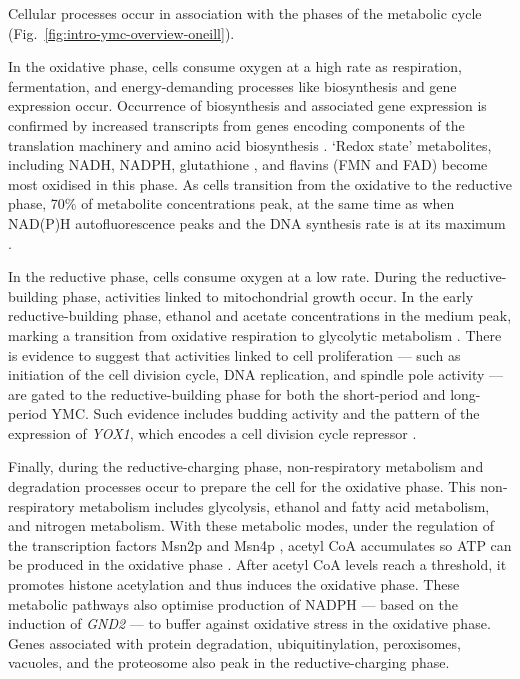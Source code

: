 Cellular processes occur in association with the phases of the metabolic cycle (Fig.\ \ref{fig:intro-ymc-overview-oneill}).

In the oxidative phase, cells consume oxygen at a high rate as respiration, fermentation, and
energy-demanding processes
like biosynthesis and gene expression occur.
Occurrence of biosynthesis and associated gene expression is confirmed by increased transcripts from genes encoding components of the translation machinery and amino acid biosynthesis \parencite{tuLogicYeastMetabolic2005}.
`Redox state' metabolites, including NADH, NADPH, glutathione \parencite{lloydUltradianMetronomeTimekeeper2005}, and flavins (FMN and FAD)
\parencite{murrayRedoxRegulationRespiring2011} become most oxidised in this phase.
As cells transition from the oxidative to the reductive phase, 70\% of metabolite concentrations peak, at the same time as when NAD(P)H autofluorescence peaks and the DNA synthesis rate is at its maximum \parencite{lloydTemporalArchitectureEukaryotic2006}.

In the reductive phase, cells consume oxygen at a low rate.
During the reductive-building phase, activities linked to mitochondrial growth occur.
In the early reductive-building phase, ethanol and acetate concentrations in the medium peak, marking a transition from oxidative respiration to glycolytic metabolism \parencite{tuCyclicChangesMetabolic2007}.
There is evidence to suggest that activities linked to cell proliferation --- such as initiation of the cell division cycle, DNA replication, and spindle pole activity --- are gated to the reductive-building phase for both the short-period and long-period YMC.
Such evidence includes budding activity and the pattern of the expression of \textit{YOX1}, which encodes a cell division cycle repressor \parencite{tuLogicYeastMetabolic2005}.

Finally, during the reductive-charging phase,
non-respiratory metabolism and degradation processes occur to prepare the cell for the oxidative phase.
This non-respiratory metabolism includes glycolysis, ethanol and fatty acid metabolism, and nitrogen metabolism.
With these metabolic modes, under the regulation of the transcription factors Msn2p and Msn4p \parencite{kuangMsn2RegulateExpression2017}, acetyl CoA accumulates so ATP can be produced in the oxidative phase \parencite{tuLogicYeastMetabolic2005}.
After acetyl CoA levels reach a threshold, it promotes histone acetylation and thus induces the oxidative phase.
These metabolic pathways also optimise production of NADPH --- based on the induction of \textit{GND2} --- to buffer against oxidative stress in the oxidative phase.
Genes associated with protein degradation, ubiquitinylation, peroxisomes, vacuoles, and the proteosome also peak in the reductive-charging phase.

